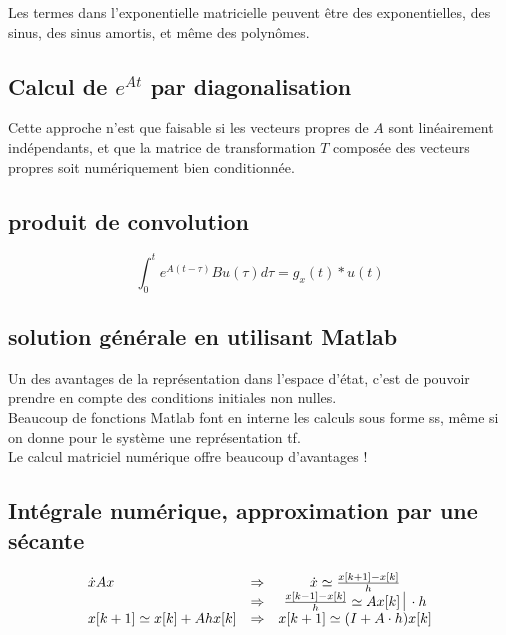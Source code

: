 \documentclass[document.tex]{subfiles}
\begin{document}
Les termes dans l'exponentielle matricielle peuvent être des
exponentielles, des sinus, des sinus amortis, et même des polynômes. \\                   

\subsection{Calcul de $e^{At}$ par diagonalisation}


Cette approche n'est que faisable si les vecteurs propres de $A$ sont linéairement indépendants, et que la matrice de transformation $T$ composée des vecteurs propres soit numériquement bien conditionnée.

\subsection{produit de convolution}
\begin{equation}
\int_0^t e^{A(t-\tau)} B u(\tau) d \tau = g_x(t) \ast u(t)
\end{equation}


\subsection{solution générale en utilisant Matlab}


Un des avantages de la représentation dans l'espace d'état, c'est de pouvoir prendre en compte des conditions initiales non nulles.\\
Beaucoup de fonctions Matlab font en interne les calculs sous forme ss, même si on donne pour le système une représentation tf.\\
Le calcul matriciel numérique offre beaucoup d'avantages !

\subsection{Intégrale numérique, approximation par une sécante}

\begin{equation}
\begin{array}{l c c}
	\dot{x} A x & \Rightarrow & \dot{x} \simeq \frac{x[k+1]-x[k]}{h} \\
	\; & \Rightarrow & \frac{x[k-1]-x[k]}{h} \simeq A x[k] \; \vline \; \cdot h \\
	x[k+1] \simeq x[k] + A h x[k] & \Rightarrow & x[k+1] \simeq (I + A \cdot h) x[k]
\end{array}
\end{equation}
\end{document}
